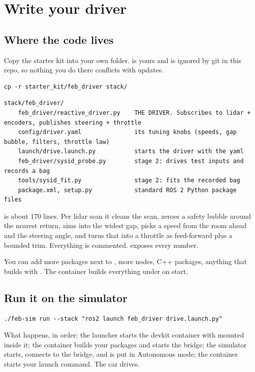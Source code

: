 \documentclass[11pt,a4paper]{article}
\begin{document}
\section{Write your driver}

\subsection{Where the code lives}

Copy the starter kit into your own folder.  is yours and is ignored by git in
this repo, so nothing you do there conflicts with updates.

\begin{lstlisting}
cp -r starter_kit/feb_driver stack/
\end{lstlisting}

\begin{lstlisting}
stack/feb_driver/
    feb_driver/reactive_driver.py    THE DRIVER. Subscribes to lidar + encoders, publishes steering + throttle
    config/driver.yaml               its tuning knobs (speeds, gap bubble, filters, throttle law)
    launch/drive.launch.py           starts the driver with the yaml
    feb_driver/sysid_probe.py        stage 2: drives test inputs and records a bag
    tools/sysid_fit.py               stage 2: fits the recorded bag
    package.xml, setup.py            standard ROS 2 Python package files
\end{lstlisting}

 is about 170 lines. Per lidar scan it cleans the scan, zeroes a safety
bubble around the nearest return, aims into the widest gap, picks a speed from the room ahead
and the steering angle, and turns that into a throttle as feed-forward plus a bounded trim.
Everything is commented.  exposes every number.

You can add more packages next to , more nodes, C++ packages, anything
that builds with . The container builds everything under  on start.

\subsection{Run it on the simulator}

\begin{lstlisting}
./feb-sim run --stack "ros2 launch feb_driver drive.launch.py"
\end{lstlisting}

What happens, in order: the launcher starts the devkit container with  mounted
inside it; the container builds your packages and starts the bridge; the simulator starts,
connects to the bridge, and is put in Autonomous mode; the container starts your launch
command. The car drives.
\end{document}
